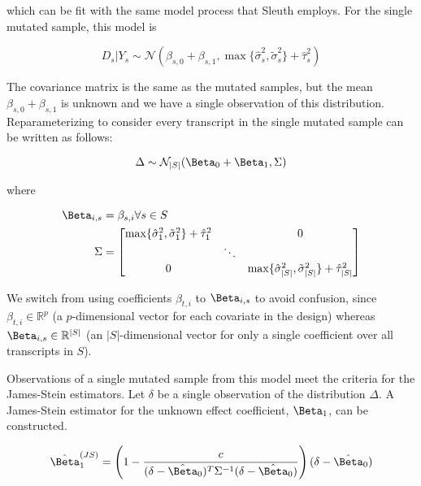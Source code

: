 which can be fit with the same model process that Sleuth employs.
For the single mutated sample, this model is

\begin{equation}
  D_s | Y_s \sim \mathcal{N} \left( \beta_{s, 0} + \beta_{s, 1}, \max\{ \hat{\sigma}_s^2, \tilde{\sigma}_s^2 \} + \hat{\tau}_s^2 \right)
  \label{eqn:single_mut_model}
\end{equation}

The covariance matrix is the same as the mutated samples, but the mean $\beta_{s, 0} + \beta_{s, 1}$ is unknown and we have a single observation of this distribution.
Reparameterizing  to consider every transcript in the single mutated sample can be written as follows:

\begin{equation}
  \Delta \sim \mathcal{N}_{|S|}(\Beta_0 + \Beta_1, \Sigma) \\
\end{equation}

where

\begin{align}
  \Beta_{i,s} &= \beta_{s,i} \forall s \in S \\
  \Sigma &= \begin{bmatrix}
    \max\{ \hat{\sigma}_1^2, \tilde{\sigma}_1^2 \} + \hat{\tau}_1^2 & & 0 \\
    & \ddots & \\
    0 & & \max\{ \hat{\sigma}_{|S|}^2, \tilde{\sigma}_{|S|}^2 \} + \hat{\tau}_{|S|}^2 \\
  \end{bmatrix}
\end{align}

We switch from using coefficients $\beta_{t,i}$ to $\Beta_{i,s}$ to avoid confusion, since $\beta_{t,i} \in \mathbb{R}^p$ (a $p$-dimensional vector for each covariate in the design) whereas $\Beta_{i,s} \in \mathbb{R}^{|S|}$ (an $|S|$-dimensional vector for only a single coefficient over all transcripts in $S$).

Observations of a single mutated sample from this model meet the criteria for the James-Stein estimators.
Let $\delta$ be a single observation of the distribution $\Delta$.
A James-Stein estimator for the unknown effect coefficient, $\Beta_1$, can be constructed.

\begin{equation}
  \hat{\Beta}_1^{(JS)} = \left( 1 - \frac{c}{(\delta - \hat{\Beta}_0)^T \Sigma^{-1} (\delta - \hat{\Beta}_0)} \right)(\delta - \hat{\Beta}_0)
  \label{eqn:js_defn}
\end{equation}

